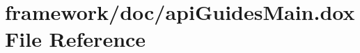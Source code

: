 \hypertarget{api_guides_main_8dox}{}\section{framework/doc/api\+Guides\+Main.dox File Reference}
\label{api_guides_main_8dox}
